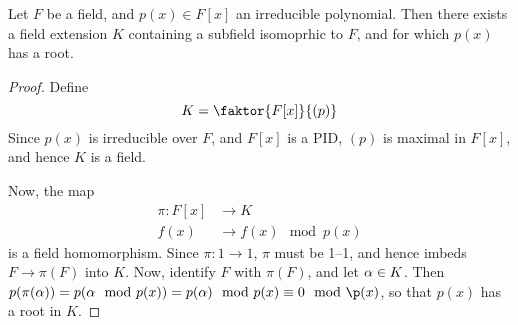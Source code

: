 \begin{theorem}\label{theorem_8.1.5}
  Let $F$ be a field, and $p(x) \in F[x]$ an irreducible polynomial.
  Then there exists a field extension $K$ containing a subfield
  isomoprhic to $F$, and for which $p(x)$ has a root.
\end{theorem}
\begin{proof}
  Define
  \begin{equation*}
    K=\faktor{F[x]}{(p)}
  \end{equation*}
  Since $p(x)$ is irreducible over $F$, and  $F[x]$ is a PID, $(p)$ is
  maximal in $F[x]$, and hence $K$ is a field.

  Now, the map
  \begin{align*}
    \pi: F[x] & \xrightarrow{} K \\
      f(x)  & \xrightarrow{} f(x) \mod{p(x)}
  \end{align*}
  is a field homomorphism. Since $\pi:1 \xrightarrow{} 1$, $\pi$ must
  be 1--1, and hence imbeds $F \xrightarrow{} \pi(F)$ into $K$. Now,
  identify $F$ with $\pi(F)$, and let $\alpha \in K$. Then
  $p(\pi(\a))=p(\a \mod{p(x)})=p(\a) \mod{p(x)} \equiv 0 \mod{\p(x)}$,
  so that $p(x)$ has a root in $K$.
\end{proof}

